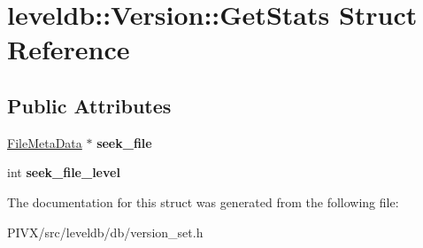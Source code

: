 \hypertarget{structleveldb_1_1_version_1_1_get_stats}{}\section{leveldb\+:\+:Version\+:\+:Get\+Stats Struct Reference}
\label{structleveldb_1_1_version_1_1_get_stats}
\subsection*{Public Attributes}
\begin{DoxyCompactItemize}
\item 
\mbox{\label{structleveldb_1_1_version_1_1_get_stats_a8c677e9a2d5bc48a5bcc40e07dd2cca7}} 
\mbox{\hyperlink{structleveldb_1_1_file_meta_data}{File\+Meta\+Data}} $\ast$ {\bfseries seek\+\_\+file}
\item 
\mbox{\label{structleveldb_1_1_version_1_1_get_stats_a6cd952d5850faf00c7d45f79973a76d4}} 
int {\bfseries seek\+\_\+file\+\_\+level}
\end{DoxyCompactItemize}


The documentation for this struct was generated from the following file\+:\begin{DoxyCompactItemize}
\item 
P\+I\+V\+X/src/leveldb/db/version\+\_\+set.\+h\end{DoxyCompactItemize}
